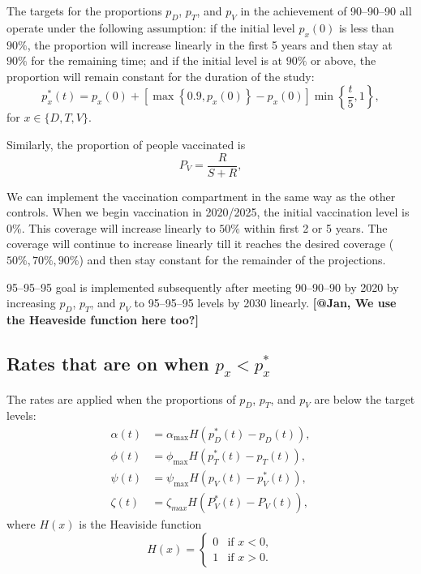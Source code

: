 \documentclass[11pt]{article}
\newcommand{\comment}[1]{\textbf{[#1]}}
\begin{document}
The targets for the proportions $p_D$, $p_T$, and $p_V$ in the achievement of 90--90--90
all operate under the following assumption:
if the initial level $p_x(0)$ is less than $90\%$, the proportion will increase
linearly in the first 5 years and then stay at $90\%$ for the
remaining time; and if the initial level is at $90\%$ or above, the proportion
will remain constant for the duration of the study:
\begin{equation}
  p_x^*(t)
  = p_x(0) + \left[
    \max\left\{0.9, p_x(0)\right\} - p_x(0)
  \right]
  \min\left\{\frac{t}{5}, 1\right\},
\end{equation}
for $x \in \{D, T, V\}$.

Similarly, the proportion of people vaccinated is
\begin{equation}
P_{V} = \frac{R}{S+R},
\end{equation}

We can implement the vaccination compartment in the same way as the other controls. When we begin
vaccination in 2020/2025, the initial vaccination level is 0\%. This
coverage will increase linearly to $50\%$ within first 2 or 5
years. The coverage will continue to increase linearly till it reaches
the desired coverage ($50\%,70\%,90\%$) and then stay constant for the
remainder of the projections.

95--95--95 goal is implemented subsequently after meeting 90--90--90
by 2020 by increasing $p_D$, $p_T$, and $p_V$ to 95--95--95 levels by
2030 linearly. \comment{@Jan, We use the Heaveside function here too?}


\subsection{Rates that are on when $p_x < p^*_x$}

The rates are applied when the proportions of $p_D$, $p_T$, and $p_V$ are below the target levels:
\begin{equation}
  \begin{split}
    \alpha(t) &= \alpha_{\max} H\left(p_D^*(t) - p_D(t)\right),
    \\
    \phi(t) &= \phi_{\max} H\left(p_T^*(t) - p_T(t)\right),
    \\
    \psi(t) &= \psi_{\max} H\left(p_V(t) - p_V^*(t)\right),
    \\
    \zeta(t) &= \zeta_{max} H\left(P^{*}_{V}(t)-P_{V}(t)\right),
  \end{split}
\end{equation}
where $H(x)$ is the Heaviside function
\begin{equation}
  H(x) =
  \begin{cases}
    0 & \text{if $x < 0$},
    \\
    1 & \text{if $x > 0$}.
  \end{cases}
\end{equation}
\end{document}
